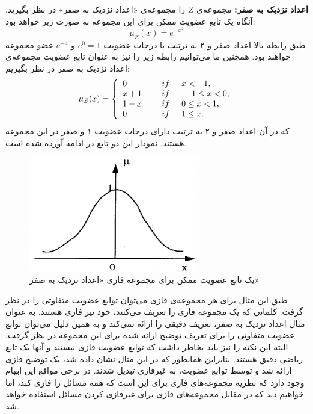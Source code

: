 \begin{exmp}\label{ex:e_2}
\textbf{اعداد نزدیک به صفر:}
مجموعه‌ی $Z$ را مجموعه‌ی «اعداد نزدیک به صفر» در نظر بگیرید. آنگاه یک تابع عضویت ممکن برای این مجموعه به صورت زیر خواهد بود:
$$ 	\mu_{Z}(x)=e^{-x^2} $$
	طبق رابطه بالا اعداد صفر و ۲ به ترتیب با درجات عضویت
$e^0=1$
	و
$e^{-4}$
	 عضو مجموعه خواهند بود. همچنین ما می‌توانیم رابطه زیر
	 را نیز به عنوان تابع عضویت مجموعه‌ی اعداد نزدیک به صفر در نظر بگیریم:
$$
	 	\mu_{Z}(x)=\left \{
	 \begin{array}{ll}
		0 \hskip 0.5cm & 	 if \hskip 0.5cm  x < -1,\\
		x+1 \hskip 0.5cm & 	if \hskip 0.5cm -1 \le x < 0,\\
		1-x \hskip 0.5cm & 	 if \hskip 0.5cm 0 \le x < 1,\\
		0 \hskip 0.5cm & 	 if \hskip 0.5cm 1 \le x.
	 \end{array}
	  \right.
$$
	که در آن اعداد صفر و ۲ به ترتیب دارای درجات عضویت ۱ و صفر در این مجموعه هستند. نمودار این  دو تابع در ادامه آورده شده است. 
	\begin{figure}[b]
		\centering 
		\includegraphics[width=75mm]{Images/Fig3.png}
		\vspace{-0.5cm}
		\caption{یک تابع عضویت ممکن برای مجموعه فازی «اعداد نزدیک به صفر»}\label{fig:f_3}
	\end{figure}
طبق این مثال برای هر مجموعه‌ی فازی می‌توان توابع عضویت متفاوتی را در نظر گرفت. کلماتی که یک مجموعه فازی را تعریف می‌کنند، خود نیز فازی هستند. به عنوان مثال اعداد نزدیک به صفر، تعریف دقیقی را ارائه نمی‌کند و به همین دلیل می‌توان توابع عضویت متفاوتی را برای تعریف توضیح ارائه شده برای این مجموعه در نظر گرفت. البته این نکته را نیز باید بخاطر داشت که توابع عضویت فازی نیستند و آنها یک تابع ریاضی دقیق هستند. 
 بنابراین همانطور که در این مثال نشان داده شد، یک توضیح فازی ارائه شد و توسط توابع عضویت، به غیرفازی  تبدیل شدند. در برخی مواقع این ابهام وجود دارد که نظریه مجموعه‌های فازی برای این است که همه مسائل را فازی کند، اما خواهیم دید که در مقابل مجموعه‌های فازی برای غیرفازی کردن مسائل استفاده خواهد شد.
\cite{Wang1997}	
\begin{figure}[h]

\end{figure}
\end{exmp}

